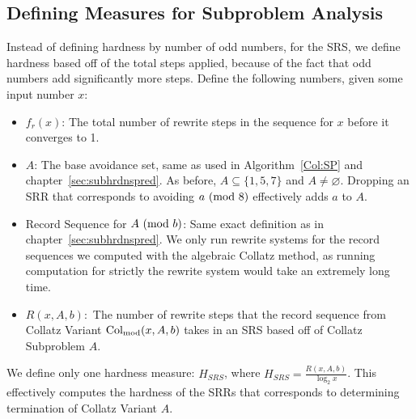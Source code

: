 \subsection{Defining Measures for Subproblem Analysis} \label{subsec:rewritemeasuredefs}
Instead of defining hardness by number of odd numbers, for the SRS, we define hardness based off of the total steps applied, because of the fact that odd numbers add significantly more steps. Define the following numbers, given some input number $x$:
\begin{itemize}
    \item $f_r(x)$: The total number of rewrite steps in the sequence for $x$ before it converges to 1.
    \item $A$: The base avoidance set, same as used in Algorithm~\ref{Col:SP} and chapter~\ref{sec:subhrdnspred}. As before, $A \subseteq \{1, 5, 7\}$ and $A \ne \varnothing$. Dropping an SRR that corresponds to avoiding $a \ (\mathrm{mod}\ 8)$  effectively adds $a$ to $A$.
    \item Record Sequence for $A \ (\mathrm{mod}\ b)$: Same exact definition as in chapter~\ref{sec:subhrdnspred}. We only run rewrite systems for the record sequences we computed with the algebraic Collatz method, as running computation for strictly the rewrite system would take an extremely long time.
    \item $R(x, A, b):$ The number of rewrite steps that the record sequence from Collatz Variant $\mathrm{Col}_{\text{mod}}(x,A,b)$ takes in an SRS based off of Collatz Subproblem $A$. 
\end{itemize}
We define only one hardness measure: $H_{SRS}$, where $H_{SRS} = \frac{R(x, A, b)}{\log_2{x}}$. This effectively computes the hardness of the SRRs that corresponds to determining termination of Collatz Variant $A$.


